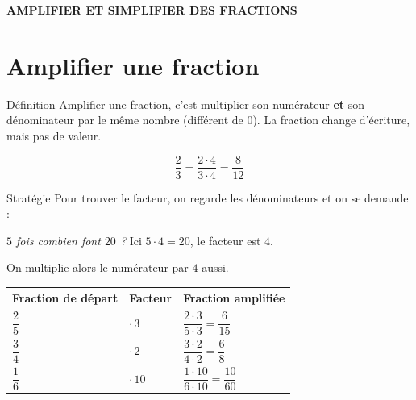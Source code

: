\newpage
{}
\begin{center}
\begin{tcolorbox}[colback=themeNO!30,colframe=themeNO!65!black,halign=flush center,width=\textwidth,arc=3mm,boxsep=3mm]
{\Large\bfseries\color{themeNO!65!black} AMPLIFIER ET SIMPLIFIER DES FRACTIONS}
\end{tcolorbox}
\end{center}

\section{Amplifier une fraction}\label{sec:AmplifierFraction}

\begin{regle}{Définition}
\textcolor{themeColor}{Amplifier} une fraction, c'est multiplier son numérateur \textbf{et} son dénominateur par le même nombre (différent de 0). La fraction change d'écriture, mais pas de valeur.

\[\dfrac{2}{3}=\dfrac{2 \cdot 4}{3 \cdot 4}=\dfrac{8}{12}\]
\end{regle}

\vspace{20pt}
\begin{astuce}{Stratégie}
Pour trouver le facteur, on regarde les dénominateurs et on se demande :

\vspace{5pt}
{\centering\textit{\og $5$ fois combien font $20$ ?\fg{}} Ici $5 \cdot 4 = 20$, le facteur est $4$.\par}

\vspace{5pt}
On multiplie alors le numérateur par $4$ aussi.
\end{astuce}

\vspace{20pt}
\def\arraystretch{3}
\begin{tabularx}{\linewidth}{|>{\centering\arraybackslash}X|>{\centering\arraybackslash}X|>{\centering\arraybackslash}X|}
\hline
\cellcolor{themeNO!30}\textbf{Fraction de départ} & \cellcolor{themeNO!30}\textbf{Facteur} & \cellcolor{themeNO!30}\textbf{Fraction amplifiée} \\\hline
$\dfrac{2}{5}$ & $\cdot\, 3$ & $\dfrac{2 \cdot 3}{5 \cdot 3}=\dfrac{6}{15}$ \\\hline
$\dfrac{3}{4}$ & $\cdot\, 2$ & $\dfrac{3 \cdot 2}{4 \cdot 2}=\dfrac{6}{8}$ \\\hline
$\dfrac{1}{6}$ & $\cdot\, 10$ & $\dfrac{1 \cdot 10}{6 \cdot 10}=\dfrac{10}{60}$ \\\hline
\end{tabularx}
\def\arraystretch{1}



